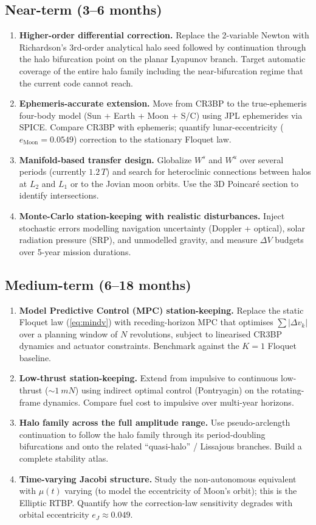 \documentclass[11pt,a4paper]{article}
\begin{document}
\subsection*{Near-term (3--6 months)}
\begin{enumerate}[leftmargin=*]
  \item \textbf{Higher-order differential correction.}
    Replace the 2-variable Newton with Richardson's 3rd-order analytical halo seed followed by continuation through the halo bifurcation point on the planar Lyapunov branch. Target automatic coverage of the entire halo family including the near-bifurcation regime that the current code cannot reach.
  \item \textbf{Ephemeris-accurate extension.}
    Move from CR3BP to the true-ephemeris four-body model (Sun + Earth + Moon + S/C) using JPL ephemerides via SPICE. Compare CR3BP with ephemeris; quantify lunar-eccentricity ($e_\text{Moon}=0.0549$) correction to the stationary Floquet law.
  \item \textbf{Manifold-based transfer design.}
    Globalize $W^s$ and $W^u$ over several periods (currently $1.2\,T$) and search for heteroclinic connections between halos at $L_2$ and $L_1$ or to the Jovian moon orbits. Use the 3D Poincaré section to identify intersections.
  \item \textbf{Monte-Carlo station-keeping with realistic disturbances.}
    Inject stochastic errors modelling navigation uncertainty (Doppler + optical), solar radiation pressure (SRP), and unmodelled gravity, and measure $\Delta V$ budgets over 5-year mission durations.
\end{enumerate}

\subsection*{Medium-term (6--18 months)}
\begin{enumerate}[resume,leftmargin=*]
  \item \textbf{Model Predictive Control (MPC) station-keeping.}
    Replace the static Floquet law (\ref{eq:mindv}) with receding-horizon MPC that optimises $\sum |\Delta v_k|$ over a planning window of $N$ revolutions, subject to linearised CR3BP dynamics and actuator constraints. Benchmark against the $K=1$ Floquet baseline.
  \item \textbf{Low-thrust station-keeping.}
    Extend from impulsive to continuous low-thrust ($\sim\SI{1}{mN}$) using indirect optimal control (Pontryagin) on the rotating-frame dynamics. Compare fuel cost to impulsive over multi-year horizons.
  \item \textbf{Halo family across the full amplitude range.}
    Use pseudo-arclength continuation to follow the halo family through its period-doubling bifurcations and onto the related ``quasi-halo'' / Lissajous branches. Build a complete stability atlas.
  \item \textbf{Time-varying Jacobi structure.}
    Study the non-autonomous equivalent with $\mu(t)$ varying (to model the eccentricity of Moon's orbit); this is the Elliptic RTBP. Quantify how the correction-law sensitivity degrades with orbital eccentricity $e_J \approx 0.049$.
\end{enumerate}
\end{document}
